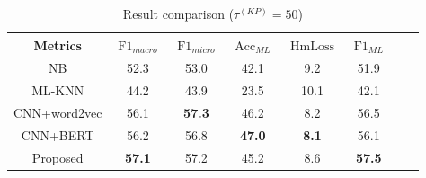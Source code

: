 \begin{table}
    \centering
    \caption{Result comparison (\(\tau^{(KP)}=50 \))}\label{tbl:bsline3}
    \begin{tabular}{cccccccc}
        \toprule
        Metrics      & \(\operatorname{F1}_{macro}\) & \(\operatorname{F1}_{micro}\) & \(\operatorname{Acc}_{ML}\) & \(\operatorname{HmLoss}\) & \(\operatorname{F1}_{ML}\) \\
        \midrule
        NB           & 52.3                          & 53.0                          & 42.1                        & 9.2                       & 51.9                       \\
        ML-KNN       & 44.2                          & 43.9                          & 23.5                        & 10.1                      & 42.1                       \\
        CNN+word2vec & 56.1                          & \textbf{57.3}                 & 46.2                        & 8.2                       & 56.5                       \\
        CNN+BERT     & 56.2                          & 56.8                          & \textbf{47.0}               & \textbf{8.1}              & 56.1                       \\
        Proposed     & \textbf{57.1}                 & 57.2                          & 45.2                        & 8.6                       & \textbf{57.5}              \\
        \bottomrule
    \end{tabular}
\end{table}


